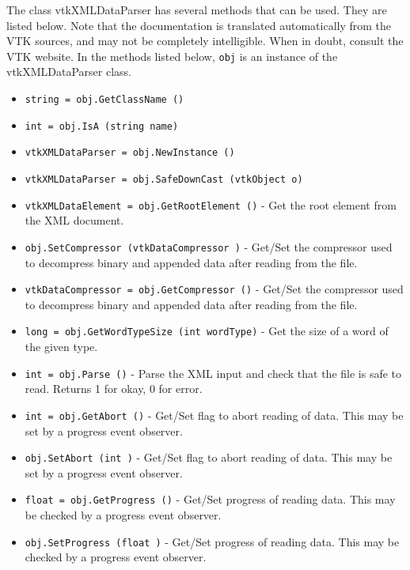 The class vtkXMLDataParser has several methods that can be used.
  They are listed below.
Note that the documentation is translated automatically from the VTK sources,
and may not be completely intelligible.  When in doubt, consult the VTK website.
In the methods listed below, \verb|obj| is an instance of the vtkXMLDataParser class.
\begin{itemize}
\item  \verb|string = obj.GetClassName ()|

\item  \verb|int = obj.IsA (string name)|

\item  \verb|vtkXMLDataParser = obj.NewInstance ()|

\item  \verb|vtkXMLDataParser = obj.SafeDownCast (vtkObject o)|

\item  \verb|vtkXMLDataElement = obj.GetRootElement ()| -  Get the root element from the XML document.

\item  \verb|obj.SetCompressor (vtkDataCompressor )| -  Get/Set the compressor used to decompress binary and appended data
 after reading from the file.

\item  \verb|vtkDataCompressor = obj.GetCompressor ()| -  Get/Set the compressor used to decompress binary and appended data
 after reading from the file.

\item  \verb|long = obj.GetWordTypeSize (int wordType)| -  Get the size of a word of the given type.

\item  \verb|int = obj.Parse ()| -  Parse the XML input and check that the file is safe to read.
 Returns 1 for okay, 0 for error.

\item  \verb|int = obj.GetAbort ()| -  Get/Set flag to abort reading of data.  This may be set by a
 progress event observer.

\item  \verb|obj.SetAbort (int )| -  Get/Set flag to abort reading of data.  This may be set by a
 progress event observer.

\item  \verb|float = obj.GetProgress ()| -  Get/Set progress of reading data.  This may be checked by a
 progress event observer.

\item  \verb|obj.SetProgress (float )| -  Get/Set progress of reading data.  This may be checked by a
 progress event observer.


\end{itemize}
